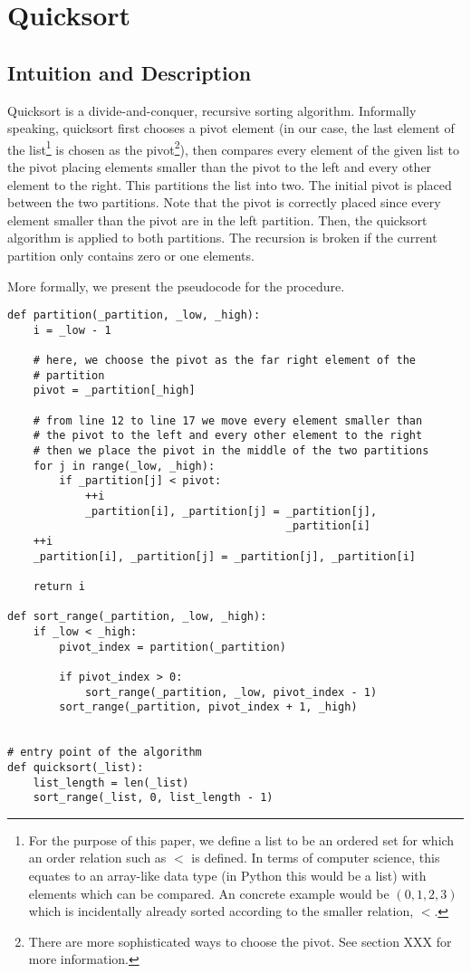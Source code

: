 \section{Quicksort}
\subsection{Intuition and Description}
Quicksort is a divide-and-conquer, recursive sorting algorithm.\cite[p.~145]{bib:introductiontoalgorithms} Informally speaking, quicksort first chooses a pivot element (in our case, the last element of the list\footnote{For the purpose of this paper, we define a list to be an ordered set for which an order relation such as \(<\) is defined. In terms of computer science, this equates to an array-like data type (in Python this would be a list) with elements which can be compared. An concrete example would be \((0, 1, 2, 3)\) which is incidentally already sorted according to the smaller relation, \(<\).} is chosen as the pivot\footnote{There are more sophisticated ways to choose the pivot. See section XXX for more information.}), then compares every element of the given list to the pivot placing elements smaller than the pivot to the left and every other element to the right. This partitions the list into two. The initial pivot is placed between the two partitions. Note that the pivot is correctly placed since every element smaller than the pivot are in the left partition. Then, the quicksort algorithm is applied to both partitions. The recursion is broken if the current partition only contains zero or one elements.

More formally, we present the pseudocode for the procedure.

\begin{lstlisting}
def partition(_partition, _low, _high):
    i = _low - 1

    # here, we choose the pivot as the far right element of the
    # partition
    pivot = _partition[_high]

    # from line 12 to line 17 we move every element smaller than 
    # the pivot to the left and every other element to the right
    # then we place the pivot in the middle of the two partitions
    for j in range(_low, _high):
        if _partition[j] < pivot:
            ++i
            _partition[i], _partition[j] = _partition[j], 
                                           _partition[i]
    ++i
    _partition[i], _partition[j] = _partition[j], _partition[i]

    return i

def sort_range(_partition, _low, _high):
    if _low < _high:
        pivot_index = partition(_partition)

        if pivot_index > 0:
            sort_range(_partition, _low, pivot_index - 1)
        sort_range(_partition, pivot_index + 1, _high)


# entry point of the algorithm
def quicksort(_list):
    list_length = len(_list)
    sort_range(_list, 0, list_length - 1)

\end{lstlisting}

